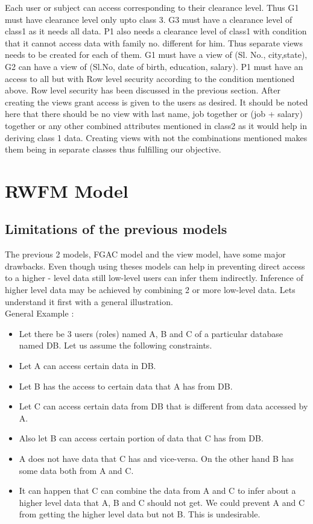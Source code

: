 \documentclass[11pt,a4paper]{report}
\begin{document}
Each user or subject can access corresponding to their clearance level.
Thus G1 must have clearance level only upto class 3. G3 must have a clearance level of class1 as it needs all data. P1 also needs a clearance level of class1 with condition that it cannot access data with family no. different for him. Thus separate views needs to be created for each of them. G1 must have a view of  
(Sl. No., city,state), G2 can have a view of (Sl.No, date of birth, education, salary). P1 must have an access to all but with Row level security according to the condition mentioned above. Row level security has been discussed in the previous section. After creating the views grant access is given to the users as desired. It should be noted here that there should be no view with last name, job together or (job + salary) together or any other combined attributes mentioned in class2 as it would help in deriving class 1 data. Creating views with not the combinations mentioned makes them being in separate classes thus fulfilling our objective. 

\chapter{RWFM Model}

\section{Limitations of the previous models}
The previous 2 models, FGAC model and the view model, have some major drawbacks. Even though using theses models can help in preventing direct access to a higher - level data still low-level users can infer them indirectly. Inference of higher level data may be achieved by combining 2 or more low-level data. Lets understand it first with a general illustration. \\

General Example : 
\begin{itemize}
    \item Let there be 3 users (roles) named A, B and C of a particular database named DB. Let us assume the following constraints.
    \item Let A can access certain data in DB.
    \item Let B has the access to certain data that A has from DB.
    \item Let C can access certain data from DB that is different from data accessed by A.
    \item Also let B can access certain portion of data that C has from DB.
    \item A does not have data that C has and vice-versa. On the other hand B has some data both from A and C. 
    \item It can happen that C can combine the data from A and C to infer about a higher level data that A, B and C should not get. We could prevent A and C from getting the higher level data but not B. This is undesirable. 
\end{itemize}
\end{document}
